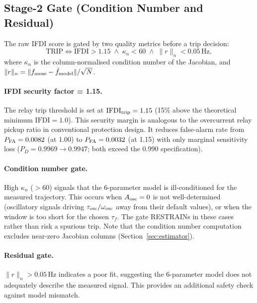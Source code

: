 \documentclass[11pt, a4paper]{article}
\newcommand{\kn}{\kappa_n}
\newcommand{\IFDI}{\mathrm{IFDI}}
\begin{document}
\subsection{Stage-2 Gate (Condition Number and Residual)}

The raw IFDI score is gated by two quality metrics before a trip decision:
\begin{equation}
  \text{TRIP} \iff
  \IFDI > 1.15
  \;\wedge\;
  \kn < 60
  \;\wedge\;
  \|r\|_n < 0.05\,\text{Hz},
  \label{eq:trip_cond}
\end{equation}
where $\kn$ is the column-normalised condition number of the Jacobian, and
$\|r\|_n = \|f_{\rm meas} - \hat{f}_{\rm model}\|/\sqrt{N}$.

\paragraph{IFDI security factor = 1.15.}
The relay trip threshold is set at $\IFDI_{\rm trip} = 1.15$ (15\% above the
theoretical minimum $\IFDI = 1.0$).  This security margin is analogous to
the overcurrent relay pickup ratio in conventional protection design.  It
reduces false-alarm rate from $P_{\rm FA} = 0.0082$ (at 1.00) to
$P_{\rm FA} = 0.0032$ (at 1.15) with only marginal sensitivity
loss ($P_D = 0.9969 \to 0.9947$; both exceed the 0.990 specification).

\paragraph{Condition number gate.}
High $\kn$ ($>60$) signals that the 6-parameter model is ill-conditioned for
the measured trajectory.  This occurs when $A_{\rm osc} = 0$ is not
well-determined (oscillatory signals driving $\tau_{\rm osc}/\omega_{\rm osc}$
away from their default values), or when the window is too short for the
chosen $\tau_f$.  The gate RESTRAINs in these cases rather than risk a
spurious trip.  Note that the condition number computation excludes
near-zero Jacobian columns (Section~\ref{sec:estimator}).

\paragraph{Residual gate.}
$\|r\|_n > 0.05\,\text{Hz}$ indicates a poor fit, suggesting the 6-parameter
model does not adequately describe the measured signal.  This provides an
additional safety check against model mismatch.


\end{document}
